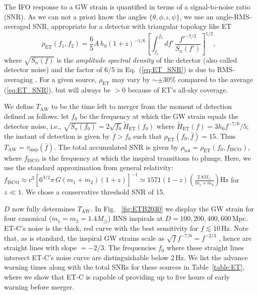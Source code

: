 \documentclass{aa}
\newcommand{\be}{\begin{equation}}
\newcommand{\ee}{\end{equation}}
\newcommand{\f}{\frac}
\begin{document}
The IFO response to a GW strain is quantified in terms of a signal-to-noise ratio (SNR).
As we can not a priori know the angles $\{\theta,\phi,\iota,\psi\}$, we use an angle-RMS-averaged SNR, 
appropriate for a detector with triangular topology like ET
%
\be
\rho_{\text{ET}}(f_1,f_2) = \f{6}{5}A\, h_0  (1+z)^{-1/6} \left[\int_{f_1}^{f_2} d f'\, \f{f'^{-7/3}}{S_n(f')}\right]^{1/2} \label{eq:ET_SNR},
\ee
%
where %
$\sqrt{S_n(f)}$ is the {\it amplitude spectral density} of the detector (also called detector noise) and
the factor of $6/5$ in Eq.~(\ref{eq:ET_SNR})
is due to RMS-averaging \citep{Akcay18}. %
For a given source, $\rho_\text{ET}$ may vary by $\sim \pm 30\%$ compared to the average (\ref{eq:ET_SNR}), but will always be $>0$ because of ET's all-sky coverage.

We define $T_\text{AW}$ to be the time left to merger from the moment of detection 
defined as follows: let $f_0$ be the frequency
at which the GW strain equals the detector noise, i.e., $\sqrt{S_n(f_0)}=2\sqrt{f_0} \tilde{H}_\text{ET}(f_0)$ where $\tilde{H}_\text{ET}(f)=3 h_0 f^{-7/6}/5$;
the instant of detection is given by 
$\bar{f}>f_0$ such that $\rho_\text{ET}(f_0,\bar{f})=15$. 
Thus $T_\text{AW} = \tau_\text{insp}(\bar{f})$.
The total accumulated SNR is given by $\rho_\text{tot}=\rho_\text{ET}(f_0, f_\text{ISCO})$, 
where $f_\text{ISCO}$ is the frequency at which the inspiral transitions to plunge. 
Here, we use the standard approximation from general relativity: 
$f_\text{ISCO} \approx {c^3}\left[{6^{3/2}\pi\, G (m_1+m_2)(1+z)}\right]^{-1} \simeq {1571}(1-z) \left(\frac{2.8M_\odot}{m_1+m_2}\right)\text{Hz}$ for $z\ll 1$. 
We chose a conservative threshold SNR of 15. %

$D$ now fully determines $T_\text{AW}$.
In Fig.~
\ref{fig:ETB2030} we display the GW strain for four canonical ($m_1=m_2=1.4 M_\odot$) BNS inspirals at $D=100,200, 400, 600\,$Mpc. 
ET-C's noise is the thick, red curve with the best sensitivity for $f\lesssim 10\,$Hz. 
Note that, as is standard, the inspiral GW strains scale as $ \sqrt{f} f^{-7/6} = f^{-2/3}$ \citep{Colpi_Sesana},
hence are straight lines with slope $=-2/3$. %
The frequencies $f_0$ where these straight lines intersect ET-C's noise curve are distinguishable below 2\,Hz.
We list the advance warning times along with the total SNRs for these sources in  Table~\ref{table:ET}, where
we show that ET-C is capable of providing up to five hours of early warning before merger.
%
\end{document}
